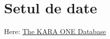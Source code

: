 \section{Setul de date}


Here: \href{http://www.cs.toronto.edu/~complingweb/data/karaOne/karaOne.html}
{The KARA ONE Database}


